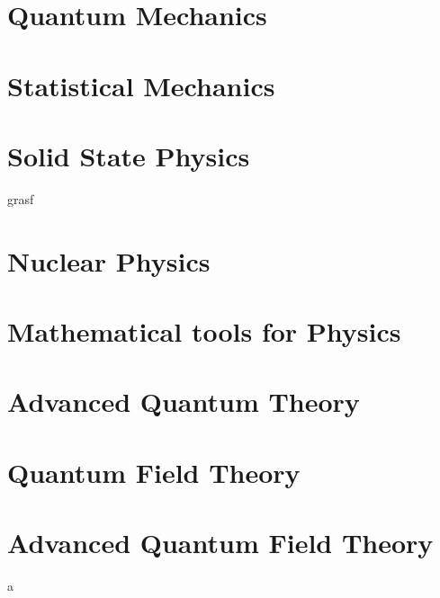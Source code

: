 \documentclass[10pt]{article}
\begin{document}
\section{Quantum Mechanics}
\section{Statistical Mechanics}
\section{Solid State Physics}
grasf
\section{Nuclear Physics}
\section{Mathematical tools for Physics}
\section{Advanced Quantum Theory}
\section{Quantum Field Theory}
\section{Advanced Quantum Field Theory}
a
\end{document}
